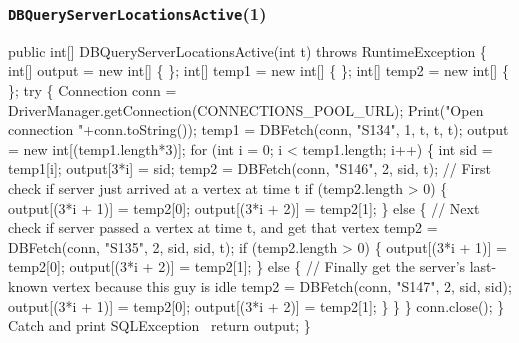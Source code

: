 \documentclass{article}
\def\nwendcode{\endtrivlist \endgroup}      %
\let\nwdocspar=\par
\theoremstyle{definition}                   %
\begin{document}
\subsubsection{{\tt{}\protect{}DBQueryServerLocationsActive}(1)}
\nwenddocs{}\endmoddef{}
public int[] DBQueryServerLocationsActive(int t) throws RuntimeException \{
  int[] output = new int[] \{ \};
  int[] temp1 = new int[] \{ \};
  int[] temp2 = new int[] \{ \};
  try \{
    Connection conn = DriverManager.getConnection(CONNECTIONS_POOL_URL);
    Print("Open connection "+conn.toString());
    temp1 = DBFetch(conn, "S134", 1, t, t, t);
    output = new int[(temp1.length*3)];
    for (int i = 0; i < temp1.length; i++) \{
      int sid = temp1[i];
      output[3*i] = sid;
      temp2 = DBFetch(conn, "S146", 2, sid, t);
      // First check if server just arrived at a vertex at time t
      if (temp2.length > 0) \{
        output[(3*i + 1)] = temp2[0];
        output[(3*i + 2)] = temp2[1];
      \} else \{
        // Next check if server passed a vertex at time t, and get that vertex
        temp2 = DBFetch(conn, "S135", 2, sid, sid, t);
        if (temp2.length > 0) \{
          output[(3*i + 1)] = temp2[0];
          output[(3*i + 2)] = temp2[1];
        \} else \{
          // Finally get the server's last-known vertex because this guy is idle
          temp2 = DBFetch(conn, "S147", 2, sid, sid);
          output[(3*i + 1)] = temp2[0];
          output[(3*i + 2)] = temp2[1];
        \}
      \}
    \}
    conn.close();
  \}
  \LA{}Catch and print \code{}SQLException\edoc{}~{\nwtagstyle{}}\RA{}
  return output;
\}
\eatline
{}\nwendcode{}\nwdocspar
\end{document}
